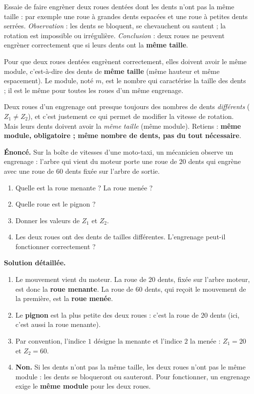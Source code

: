 \documentclass[11pt]{article}
\newcommand{\cle}[1]{{\popxbold\color{popdark}#1}}
\begin{document}
Essaie de faire engrèner deux roues dentées dont les dents n'ont pas la même taille : par exemple une roue à grandes dents espacées et une roue à petites dents serrées. \emph{Observation} : les dents se bloquent, se chevauchent ou sautent ; la rotation est impossible ou irrégulière. \emph{Conclusion} : deux roues ne peuvent engrèner correctement que si leurs dents ont la \textbf{même taille}.

\begin{propriete}
Pour que deux roues dentées engrènent correctement, elles doivent avoir le \cle{même module}, c'est-à-dire des dents de \textbf{même taille} (même hauteur et même espacement). Le module, noté $m$, est le nombre qui caractérise la taille des dents ; il est le même pour toutes les roues d'un même engrenage.
\end{propriete}

\begin{attention}
Deux roues d'un engrenage ont presque toujours des nombres de dents \emph{différents} ($Z_1 \neq Z_2$), et c'est justement ce qui permet de modifier la vitesse de rotation. Mais leurs dents doivent avoir la \emph{même taille} (même module). Retiens : \textbf{même module, obligatoire ; même nombre de dents, pas du tout nécessaire}.
\end{attention}

\begin{exoresolu}
\textbf{Énoncé.} Sur la boîte de vitesses d'une moto-taxi, un mécanicien observe un engrenage : l'arbre qui vient du moteur porte une roue de $20$ dents qui engrène avec une roue de $60$ dents fixée sur l'arbre de sortie.
\begin{enumerate}
\item Quelle est la roue menante ? La roue menée ?
\item Quelle roue est le pignon ?
\item Donner les valeurs de $Z_1$ et $Z_2$.
\item Les deux roues ont des dents de tailles différentes. L'engrenage peut-il fonctionner correctement ?
\end{enumerate}
\tcblower
\textbf{Solution détaillée.}
\begin{enumerate}
\item Le mouvement vient du moteur. La roue de $20$ dents, fixée sur l'arbre moteur, est donc la \textbf{roue menante}. La roue de $60$ dents, qui reçoit le mouvement de la première, est la \textbf{roue menée}.
\item Le \textbf{pignon} est la plus petite des deux roues : c'est la roue de $20$ dents (ici, c'est aussi la roue menante).
\item Par convention, l'indice $1$ désigne la menante et l'indice $2$ la menée : $Z_1 = 20$ et $Z_2 = 60$.
\item \textbf{Non.} Si les dents n'ont pas la même taille, les deux roues n'ont pas le même module : les dents se bloqueront ou sauteront. Pour fonctionner, un engrenage exige le \textbf{même module} pour les deux roues.
\end{enumerate}
\end{exoresolu}
\end{document}
